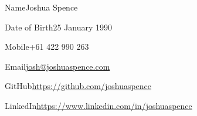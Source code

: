 \begin{personalDetails}
\item{Name}{Joshua Spence}
\item{Date of Birth}{25 January 1990}
\item{Mobile}{+61 422 990 263\vspace{1em}}
\item{Email}{\url{josh@joshuaspence.com}}
\item{GitHub}{\url{https://github.com/joshuaspence}}
\item{LinkedIn}{\url{https://www.linkedin.com/in/joshuaspence}}
\end{personalDetails}
